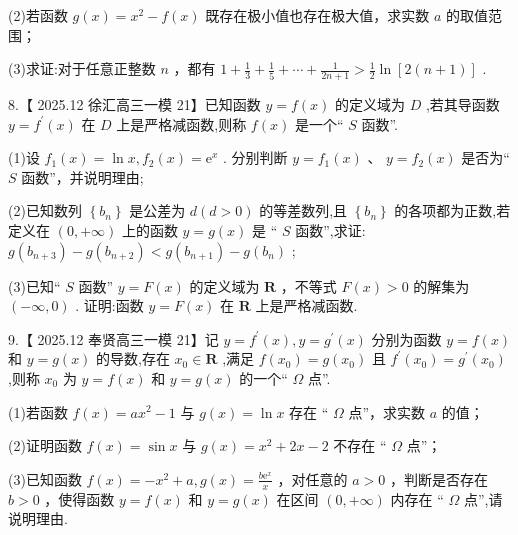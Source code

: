 \documentclass[10pt]{article}
\begin{document}
(2)若函数 \(g\left( x\right)  = {x}^{2} - f\left( x\right)\) 既存在极小值也存在极大值，求实数 \(a\) 的取值范围；

(3)求证:对于任意正整数 \(n\) ，都有 \(1 + \frac{1}{3} + \frac{1}{5} + \cdots  + \frac{1}{{2n} + 1} > \frac{1}{2}\ln \left\lbrack  {2\left( {n + 1}\right) }\right\rbrack\) .

8.【 2025.12 徐汇高三一模 21】已知函数 \(y = f\left( x\right)\) 的定义域为 \(D\) ,若其导函数 \(y = {f}^{\prime }\left( x\right)\) 在 \(D\) 上是严格减函数,则称 \(f\left( x\right)\) 是一个“ \(S\) 函数”.

(1)设 \({f}_{1}\left( x\right)  = \ln x,{f}_{2}\left( x\right)  = {\mathrm{e}}^{x}\) . 分别判断 \(y = {f}_{1}\left( x\right) \text{ 、 }y = {f}_{2}\left( x\right)\) 是否为“ \(S\) 函数”，并说明理由;

(2)已知数列 \(\left\{  {b}_{n}\right\}\) 是公差为 \(d\left( {d > 0}\right)\) 的等差数列,且 \(\left\{  {b}_{n}\right\}\) 的各项都为正数,若定义在 \(\left( {0, + \infty }\right)\) 上的函数 \(y = g\left( x\right)\) 是 “ \(S\) 函数”,求证: \(g\left( {b}_{n + 3}\right)  - g\left( {b}_{n + 2}\right)  < g\left( {b}_{n + 1}\right)  - g\left( {b}_{n}\right)\) ;

(3)已知“ \(S\) 函数” \(y = F\left( x\right)\) 的定义域为 \(\mathbf{R}\) ，不等式 \(F\left( x\right)  > 0\) 的解集为 \(\left( {-\infty ,0}\right)\) . 证明:函数 \(y = F\left( x\right)\) 在 \(\mathbf{R}\) 上是严格减函数.

9.【 2025.12 奉贤高三一模 21】记 \(y = {f}^{\prime }\left( x\right) ,y = {g}^{\prime }\left( x\right)\) 分别为函数 \(y = f\left( x\right)\) 和 \(y = g\left( x\right)\) 的导数,存在 \({x}_{0} \in  \mathbf{R}\) ,满足 \(f\left( {x}_{0}\right)  = g\left( {x}_{0}\right)\) 且 \({f}^{\prime }\left( {x}_{0}\right)  = {g}^{\prime }\left( {x}_{0}\right)\) ,则称 \({x}_{0}\) 为 \(y = f\left( x\right)\) 和 \(y = g\left( x\right)\) 的一个“ \(\Omega\) 点”.

(1)若函数 \(f\left( x\right)  = a{x}^{2} - 1\) 与 \(g\left( x\right)  = \ln x\) 存在 “ \(\Omega\) 点”，求实数 \(a\) 的值；

(2)证明函数 \(f\left( x\right)  = \sin x\) 与 \(g\left( x\right)  = {x}^{2} + {2x} - 2\) 不存在 “ \(\Omega\) 点”；

(3)已知函数 \(f\left( x\right)  =  - {x}^{2} + a,g\left( x\right)  = \frac{b{\mathrm{e}}^{x}}{x}\) ，对任意的 \(a > 0\) ，判断是否存在 \(b > 0\) ，使得函数 \(y = f\left( x\right)\) 和 \(y = g\left( x\right)\) 在区间 \(\left( {0, + \infty }\right)\) 内存在 “ \(\Omega\) 点”,请说明理由.
\end{document}
